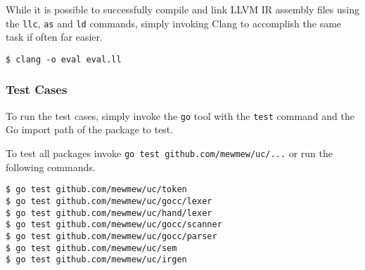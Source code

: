 While it is possible to successfully compile and link LLVM IR assembly files using the \texttt{llc}, \texttt{as} and \texttt{ld} commands, simply invoking Clang to accomplish the same task if often far easier.

\begin{verbatim}
$ clang -o eval eval.ll
\end{verbatim}

\subsubsection{Test Cases}

To run the test cases, simply invoke the \texttt{go} tool with the \texttt{test} command and the Go import path of the package to test.

To test all packages invoke \texttt{go test github.com/mewmew/uc/...} or run the following commands.

\begin{verbatim}
$ go test github.com/mewmew/uc/token
$ go test github.com/mewmew/uc/gocc/lexer
$ go test github.com/mewmew/uc/hand/lexer
$ go test github.com/mewmew/uc/gocc/scanner
$ go test github.com/mewmew/uc/gocc/parser
$ go test github.com/mewmew/uc/sem
$ go test github.com/mewmew/uc/irgen
\end{verbatim}
